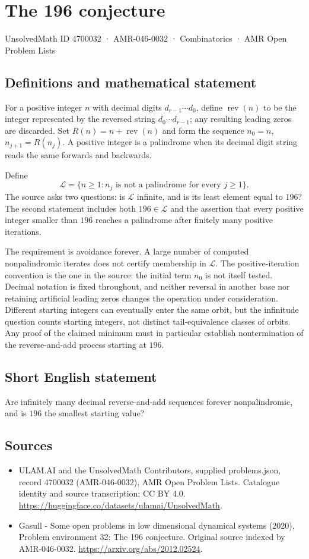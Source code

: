 \documentclass[11pt,a4paper]{article}
\begin{document}
\section*{The 196 conjecture}\label{4700032}
{\small UnsolvedMath ID 4700032 · AMR-046-0032 · Combinatorics · AMR Open Problem Lists}
\subsection{Definitions and mathematical statement}
For a positive integer $n$ with decimal digits $d_{r-1}\cdots d_0$, define
$\operatorname{rev}(n)$ to be the integer represented by the reversed
string $d_0\cdots d_{r-1}$; any resulting leading zeros are discarded.
Set $R(n)=n+\operatorname{rev}(n)$ and form the sequence
$n_0=n$, $n_{j+1}=R(n_j)$. A positive integer is a palindrome when its
decimal digit string reads the same forwards and backwards.

Define
\[
 \mathcal L=\{n\ge1:n_j\text{ is not a palindrome for every }j\ge1\}.
\]
The source asks two questions: is $\mathcal L$ infinite, and is its least
element equal to $196$? The second statement includes both
$196\in\mathcal L$ and the assertion that every positive integer smaller
than $196$ reaches a palindrome after finitely many positive iterations.

The requirement is avoidance forever. A large number of computed
nonpalindromic iterates does not certify membership in $\mathcal L$.
The positive-iteration convention is the one in the source: the initial
term $n_0$ is not itself tested. Decimal notation is fixed throughout,
and neither reversal in another base nor retaining artificial leading
zeros changes the operation under consideration. Different starting
integers can eventually enter the same orbit, but the infinitude question
counts starting integers, not distinct tail-equivalence classes of
orbits. Any proof of the claimed minimum must in particular establish
nontermination of the reverse-and-add process starting at $196$.
\subsection{Short English statement}
Are infinitely many decimal reverse-and-add sequences forever nonpalindromic, and is $196$ the smallest starting value?
\subsection{Sources}
\begin{itemize}
\item[S1] ULAM.AI and the UnsolvedMath Contributors, supplied problems.json, record 4700032 (AMR-046-0032), AMR Open Problem Lists. Catalogue identity and source transcription; CC BY 4.0.
\url{https://huggingface.co/datasets/ulamai/UnsolvedMath}.
\item[S2] Gasull - Some open problems in low dimensional dynamical systems (2020), Problem environment 32: The 196 conjecture. Original source indexed by AMR-046-0032.
\url{https://arxiv.org/abs/2012.02524}.
\end{itemize}
\end{document}
